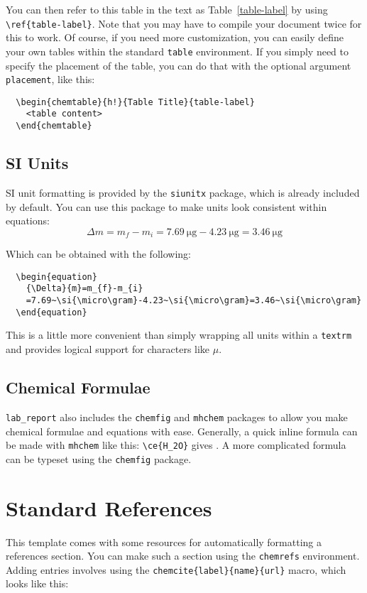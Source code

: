 \documentclass{lab_report}
\begin{document}
You can then refer to this table in the text as Table~\ref{table-label} by using \verb|\ref{table-label}|. Note that you may have to compile your document twice for this to work.
Of course, if you need more customization, you can easily define your own tables within the standard \verb|table| environment. If you simply need to specify the placement of the table, you can do that with the optional argument \verb|placement|, like this:
\begin{verbatim}
  \begin{chemtable}{h!}{Table Title}{table-label}
    <table content>
  \end{chemtable}
\end{verbatim}

\subsection{SI Units}
SI unit formatting is provided by the \verb|siunitx| package, which is already included by default. You can use this package to make units look consistent within equations:
\begin{equation}
  {\Delta}{m}=m_{f}-m_{i}=7.69~\si{\micro\gram}-4.23~\si{\micro\gram}=3.46~\si{\micro\gram}
\end{equation}

Which can be obtained with the following:
\begin{verbatim}
  \begin{equation}
    {\Delta}{m}=m_{f}-m_{i}
    =7.69~\si{\micro\gram}-4.23~\si{\micro\gram}=3.46~\si{\micro\gram}
  \end{equation}
\end{verbatim}

This is a little more convenient than simply wrapping all units within a \verb|textrm| and provides logical support for characters like $\mu$.

\subsection{Chemical Formulae}
\verb|lab_report| also includes the \verb|chemfig| and \verb|mhchem| packages to allow you make chemical formulae and equations with ease. Generally, a quick inline formula can be made with \verb|mhchem| like this: \verb|\ce{H_2O}| gives . A more complicated formula can be typeset using the \verb|chemfig| package.

\section{Standard References}
This template comes with some resources for automatically formatting a references section. You can make such a section using the \verb|chemrefs| environment. Adding entries involves using the \verb|chemcite{label}{name}{url}| macro, which looks like this:
\end{document}
